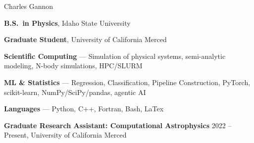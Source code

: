 \begin{vitapage}

\begin{center}
    Charles Gannon
\end{center}

\begin{edu}
  \item[2021]  \textbf{B.S.\ in Physics}, Idaho State University 
  \item[2021-present] \textbf{Graduate Student}, University of California Merced
\end{edu}

\begin{skills}
 \item \textbf{Scientific Computing} --- Simulation of physical systems, semi-analytic modeling, N-body simulations,  HPC/SLURM
 \item \textbf{ML \& Statistics} --- Regression, Classification, Pipeline Construction, PyTorch, scikit-learn, NumPy/SciPy/pandas, agentic AI 
 \item \textbf{Languages} --- Python, C++, Fortran, Bash, LaTex

\end{skills}

\begin{jobs}
 \item \textbf{Graduate Research Assistant: Computational Astrophysics} 2022 -- Present, University of California Merced
  \begin{enumerate}


\end{enumerate}
\end{jobs}
\end{vitapage}
